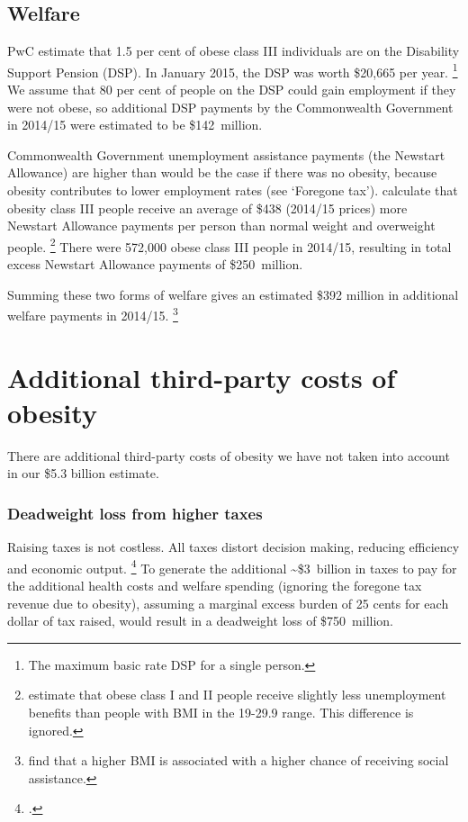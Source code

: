 \documentclass[embargoed]{grattan}
\begin{document}
\subsection{Welfare}\label{welfare}

PwC estimate that 1.5 per cent of obese class III individuals are on the Disability Support Pension (DSP).
In January 2015, the DSP was worth \$20,665 per year.%
\footnote{The maximum basic rate DSP for a single person.} We assume that 80 per cent of people on the DSP could gain employment if they were not obese, so additional DSP payments by the Commonwealth Government in 2014/15 were estimated to be \$142~million.

Commonwealth Government unemployment assistance payments (the Newstart Allowance) are higher than would be the case if there was no obesity, because obesity contributes to lower employment rates (see `Foregone tax'). \textcite{Colagiuri2010costoverweightobesity} calculate that obesity class III people receive an average of \$438 (2014/15 prices) more Newstart Allowance payments per person than normal weight and overweight people.%
\footnote{\textcite{Colagiuri2010costoverweightobesity} estimate that obese class I and II people receive slightly less unemployment benefits than people with BMI in the 19-29.9 range.
This difference is ignored.} There were 572,000 obese class III people in 2014/15, resulting in total excess Newstart Allowance payments of \$250~million.

Summing these two forms of welfare gives an estimated \$392 million in additional welfare payments in 2014/15.%
\footnote{\textcite{Boeckerman2016EffectWeightLabor} find that a higher BMI is associated with a higher chance of receiving social assistance.}

\section{Additional third-party costs of obesity }\label{additional-third-party-costs-of-obesity}

There are additional third-party costs of obesity we have not taken into account in our \$5.3 billion estimate.

\subsubsection{Deadweight loss from higher taxes}\label{deadweight-loss-from-higher-taxes}

Raising taxes is not costless.
All taxes distort decision making, reducing efficiency and economic output.%
\footcites[][Box~1]{Daley2015Propertytaxes}{Freebairn2010Taxationobesity} To generate the additional \textasciitilde{}\$3~billion in taxes to pay for the additional health costs and welfare spending (ignoring the foregone tax revenue due to obesity), assuming a marginal excess burden of 25 cents for each dollar of tax raised, would result in a deadweight loss of \$750~million.
\end{document}
